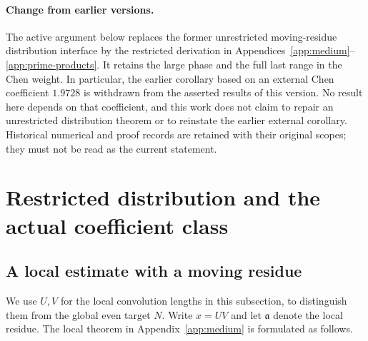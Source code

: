 \paragraph{Change from earlier versions.}
The active argument below replaces the former unrestricted
moving-residue distribution interface by the restricted derivation in
Appendices~\ref{app:medium}--\ref{app:prime-products}.  It retains the
large phase and the full last range in the Chen weight.  In particular,
the earlier corollary based on an external Chen coefficient $1.9728$ is
withdrawn from the asserted results of this version.  No result here
depends on that coefficient, and this work does not claim to repair an
unrestricted distribution theorem or to reinstate the earlier external
corollary.  Historical numerical and proof records are retained with
their original scopes; they must not be read as the current statement.

\section{Restricted distribution and the actual coefficient class}
\label{sec:current-distribution}

\subsection{A local estimate with a moving residue}

We use $U,V$ for the local convolution lengths in this subsection, to
distinguish them from the global even target $N$.  Write $x=UV$ and let
$\mathfrak a$ denote the local residue.  The local theorem in
Appendix~\ref{app:medium} is formulated as follows.


